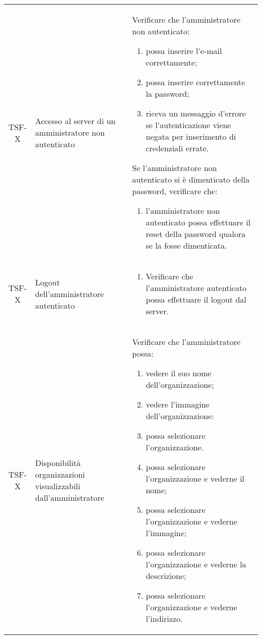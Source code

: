 {\begin{longtable}{ c | C{3cm} | C{11cm} }
TSF-X & Accesso al server di un amministratore non autenticato & 
Verificare che l'amministratore non autenticato:
\begin{enumerate}
    \item possa inserire l'e-mail correttamente;
    \item possa inserire correttamente la password;
    \item riceva un messaggio d'errore se l'autenticazione viene negata per inserimento di credenziali errate.
\end{enumerate}
Se l'amministratore non autenticato si è dimenticato della password, verificare che:
\begin{enumerate}
    \item l'amministratore non autenticato possa effettuare il reset della password qualora se la fosse dimenticata.
\end{enumerate} \\

TSF-X & Logout dell'amministratore autenticato & \begin{enumerate}
    \item Verificare che l'amministratore autenticato possa effettuare il logout dal server.
\end{enumerate} \\

TSF-X & Disponibilità organizzazioni visualizzabili dall'amministratore &
Verificare che l'amministratore possa:
\begin{enumerate}
    \item vedere il suo nome dell'organizzazione;
    \item vedere l'immagine dell'organizzazione:
    \item possa selezionare l'organizzazione.
    \item possa selezionare l'organizzazione e vederne il nome;
    \item possa selezionare l'organizzazione e vederne l'immagine;
    \item possa selezionare l'organizzazione e vederne la descrizione;
    \item possa selezionare l'organizzazione e vederne l'indirizzo.
\end{enumerate} \\


\end{longtable}}
